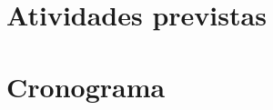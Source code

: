 \documentclass[
	12pt,				%
	oneside,			%
	a4paper,			%
	english,			%
	french,				%
	spanish,			%
	brazil				%
	]{abntex2}
\begin{document}
\hypertarget{atividades-previstas}{%
\section{Atividades previstas}\label{atividades-previstas}}

\hypertarget{cronograma}{%
\section{Cronograma}\label{cronograma}}

\postextual

\postextual



\end{document}
